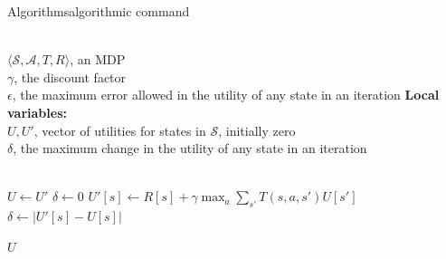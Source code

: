 \begin{frame}{Algorithms}{algorithmic command}
    \begin{scriptsize}
        \begin{algorithmic}
            \REQUIRE ~\\
                     $\langle \mathcal{S}, \mathcal{A}, T, R \rangle$, an MDP\\
                     $\gamma$, the discount factor\\
                     $\epsilon$, the maximum error allowed in the utility of any state in an iteration
            \STATE \hspace{-1em}\textbf{Local variables:}\\
                    $U, U'$, vector of utilities for states in $\mathcal{S}$, initially zero\\
                    $\delta$, the maximum change in the utility of any state in an iteration\\
                    ~

            \REPEAT
                \STATE $U \leftarrow U'$
                \STATE $\delta \leftarrow 0$
                    \STATE $U'[s] \leftarrow R[s] + \gamma \max_a \sum_{s'} T(s,a,s') U[s']$
                        \STATE $\delta \leftarrow |U'[s] - U[s]|$
                    \ENDIF
                \ENDFOR
            ~

            \RETURN $U$
        \end{algorithmic}
    \end{scriptsize}
\end{frame}
\note{
}


